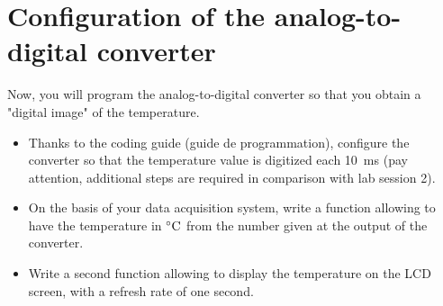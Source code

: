 \documentclass[11pt,a4paper]{article}
\theoremstyle{definition}%
\begin{document}



\section{Configuration of the analog-to-digital converter}
Now, you will program the analog-to-digital converter so that you obtain a "digital image" of the temperature.
\begin{itemize}
	\item Thanks to the coding guide (guide de programmation), configure the converter so that the temperature value is digitized each 10~ms (pay attention, additional steps are required in comparison with lab session 2).
	\item On the basis of your data acquisition system, write a function allowing to have the temperature in $\celsius$ from the number given at the output of the converter.
	\item Write a second function allowing to display the temperature on the LCD screen, with a refresh rate of one second.
\end{itemize}






\end{document}
